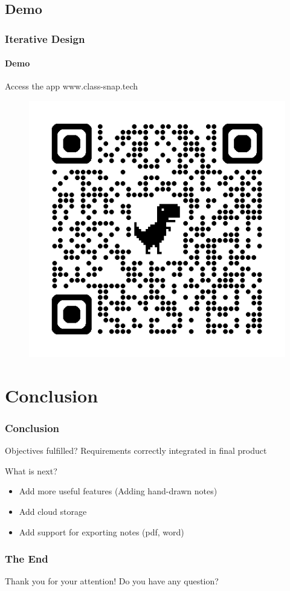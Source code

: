 \documentclass{beamer}
\begin{document}
	\subsection{Demo}
	\begin{frame}
		\frametitle{Iterative Design}
		\framesubtitle{Demo}
		
		\begin{alertblock}{Access the app}
			www.class-snap.tech
			
			\begin{figure}
				\centering
				\begin{minipage}{0.4\textwidth}
					\includegraphics[width=\linewidth]{qrcode}
				\end{minipage}
			\end{figure}
		\end{alertblock}
	\end{frame}
	
	\section{Conclusion}
	\begin{frame}
		\frametitle{Conclusion}
		
		\begin{alertblock}{Objectives fulfilled?}
			Requirements correctly integrated in final product
		\end{alertblock}
		
		\begin{alertblock}{What is next?}
			\begin{itemize}
				\item Add more useful features (Adding hand-drawn notes)
				\item Add cloud storage
				\item Add support for exporting notes (pdf, word)
			\end{itemize}
		\end{alertblock}
	\end{frame}
	
	\begin{frame}
		\frametitle{The End}
		
		\centering
		Thank you for your attention!
		\linebreak
		Do you have any question?
	\end{frame}
\end{document}
